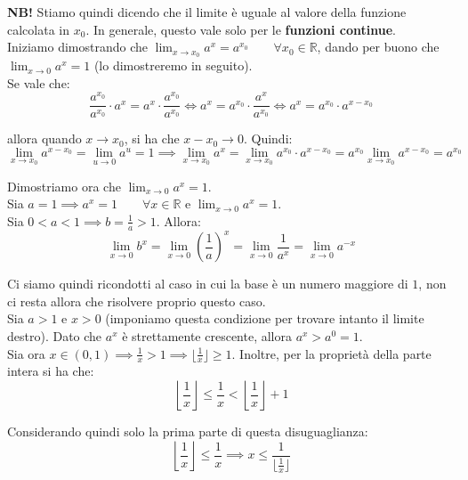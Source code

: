 \documentclass{article}
\begin{document}
\noindent\textbf{NB!} Stiamo quindi dicendo che il limite è uguale al valore della funzione calcolata in $x_0$. In generale, questo vale solo per le \textbf{funzioni continue}.\\

\noindent Iniziamo dimostrando che $\lim_{x \to x_0} a^x = a^{x_0} \qquad \forall x_0 \in \mathbb{R}$, dando per buono che $\lim_{x \to 0} a^x = 1$ (lo dimostreremo in seguito). \\
Se vale che:
\begin{equation*}
    \frac{a^{x_0}}{a^{x_0}} \cdot a^x = a^x \cdot \frac{a^{x_0}}{a^{x_0}} \iff a^x = a^{x_0} \cdot \frac{a^x}{a^{x_0}} \iff a^x = a^{x_0} \cdot a^{x - x_0}
\end{equation*}

\noindent allora quando $x \to x_0$, si ha che $x - x_0 \to 0$. Quindi:
\begin{equation*}
    \lim_{x \to x_0} a^{x - x_0} = \lim_{u \to 0} a^u = 1 \implies \lim_{x \to x_0} a^x = \lim_{x \to x_0} a^{x_0} \cdot a^{x - x_0} = a^{x_0} \lim_{x \to x_0} a^{x - x_0} = a^{x_0}
\end{equation*}

\noindent Dimostriamo ora che $\lim_{x \to 0} a^x = 1$. \\
Sia $a = 1 \implies a^x = 1 \qquad \forall x \in \mathbb{R}$ e $\lim_{x \to 0} a^x = 1$.\\
Sia $0 < a < 1 \implies b = \frac{1}{a} > 1$. Allora:
\begin{equation*}
    \lim_{x \to 0} b^x = \lim_{x \to 0} \left(\frac{1}{a}\right)^x = \lim_{x \to 0} \frac{1}{a^x} = \lim_{x \to 0} a^{-x}
\end{equation*}

\noindent Ci siamo quindi ricondotti al caso in cui la base è un numero maggiore di $1$, non ci resta allora che risolvere proprio questo caso.\\
Sia $a > 1$ e $x > 0$ (imponiamo questa condizione per trovare intanto il limite destro). Dato che $a^x$ è strettamente crescente, allora $a^x > a^0 = 1$.\\
Sia ora $x \in (0, 1) \implies \frac{1}{x} > 1 \implies \lfloor \frac{1}{x} \rfloor \geq 1$. Inoltre, per la proprietà della parte intera si ha che:
\begin{equation*}
    \left\lfloor \frac{1}{x} \right\rfloor \leq \frac{1}{x} < \left\lfloor \frac{1}{x} \right\rfloor + 1 
\end{equation*}

\noindent Considerando quindi solo la prima parte di questa disuguaglianza:
\begin{equation*}
    \left\lfloor \frac{1}{x} \right\rfloor \leq \frac{1}{x} \implies x \leq \frac{1}{\lfloor \frac{1}{x} \rfloor}
\end{equation*}
\end{document}

